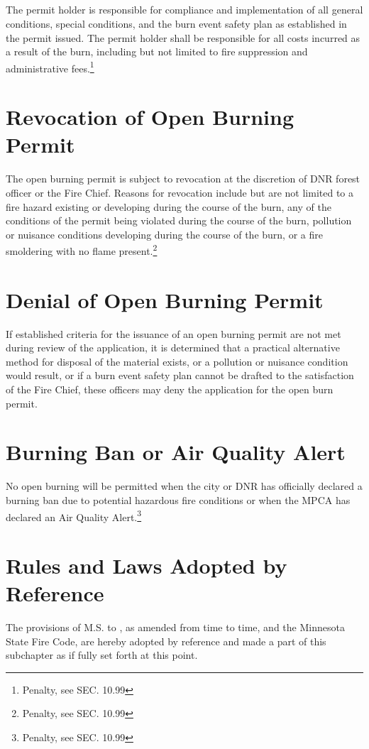\subsection{}
The permit holder is responsible for compliance and implementation of all general conditions, special conditions, and the burn event safety plan as established in the permit issued.  The permit holder shall be responsible for all costs incurred as a result of the burn, including but not limited to fire suppression and administrative fees.\footnote{Penalty, see SEC. 10.99}
\section{Revocation of Open Burning Permit}
The open burning permit is subject to revocation at the discretion of DNR forest officer or the Fire Chief.  Reasons for revocation include but are not limited to a fire hazard existing or developing during the course of the burn, any of the conditions of the permit being violated during the course of the burn, pollution or nuisance conditions developing during the course of the burn, or a fire smoldering with no flame present.\footnote{Penalty, see SEC. 10.99}
\section{Denial of Open Burning Permit}
If established criteria for the issuance of an open burning permit are not met during review of the application, it is determined that a practical alternative method for disposal of the material exists, or a pollution or nuisance condition would result, or if a burn event safety plan cannot be drafted to the satisfaction of the Fire Chief, these officers may deny the application for the open burn permit.
\section{Burning Ban or Air Quality Alert}
No open burning  will be permitted when the city or DNR has officially declared a burning ban due to potential hazardous fire conditions or when the MPCA has declared an Air Quality Alert.\footnote{Penalty, see SEC. 10.99}
\section{Rules and Laws Adopted by Reference}
The provisions of M.S.  to , as amended from time to time, and the Minnesota State Fire Code, are hereby adopted by reference and made a part of this subchapter as if fully set forth at this point.
